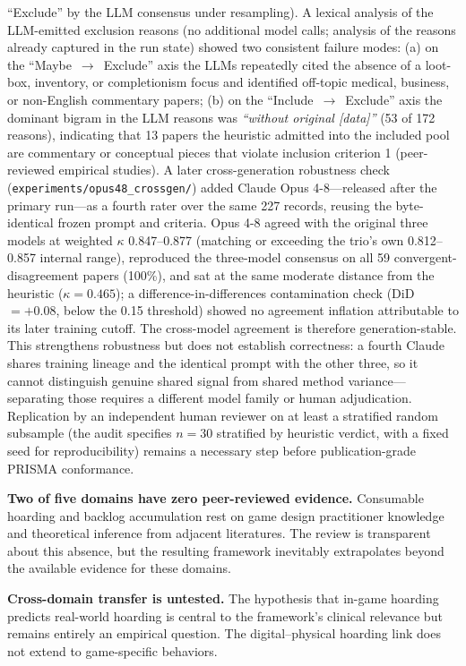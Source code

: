 \documentclass[12pt]{article}
\begin{document}
``Exclude'' by the LLM consensus under resampling). A lexical analysis of the LLM-emitted exclusion reasons (no additional model calls; analysis of the reasons already captured in the run state) showed two consistent failure modes: (a) on the ``Maybe~$\rightarrow$~Exclude'' axis the LLMs repeatedly cited the absence of a loot-box, inventory, or completionism focus and identified off-topic medical, business, or non-English commentary papers; (b) on the ``Include~$\rightarrow$~Exclude'' axis the dominant bigram in the LLM reasons was \emph{``without original [data]''} (53 of 172 reasons), indicating that 13 papers the heuristic admitted into the included pool are commentary or conceptual pieces that violate inclusion criterion 1 (peer-reviewed empirical studies). A later cross-generation robustness check (\texttt{experiments/opus48\_crossgen/}) added Claude Opus 4-8---released after the primary run---as a fourth rater over the same 227 records, reusing the byte-identical frozen prompt and criteria. Opus 4-8 agreed with the original three models at weighted $\kappa$ 0.847--0.877 (matching or exceeding the trio's own 0.812--0.857 internal range), reproduced the three-model consensus on all 59 convergent-disagreement papers (100\%), and sat at the same moderate distance from the heuristic ($\kappa = 0.465$); a difference-in-differences contamination check (DiD $= +0.08$, below the 0.15 threshold) showed no agreement inflation attributable to its later training cutoff. The cross-model agreement is therefore generation-stable. This strengthens robustness but does not establish correctness: a fourth Claude shares training lineage and the identical prompt with the other three, so it cannot distinguish genuine shared signal from shared method variance---separating those requires a different model family or human adjudication. Replication by an independent human reviewer on at least a stratified random subsample (the audit specifies $n=30$ stratified by heuristic verdict, with a fixed seed for reproducibility) remains a necessary step before publication-grade PRISMA conformance.

\textbf{Two of five domains have zero peer-reviewed evidence.} Consumable hoarding and backlog accumulation rest on game design practitioner knowledge and theoretical inference from adjacent literatures. The review is transparent about this absence, but the resulting framework inevitably extrapolates beyond the available evidence for these domains.

\textbf{Cross-domain transfer is untested.} The hypothesis that in-game hoarding predicts real-world hoarding is central to the framework's clinical relevance but remains entirely an empirical question. The digital--physical hoarding link \citep{Thorpe2019} does not extend to game-specific behaviors.
\end{document}
